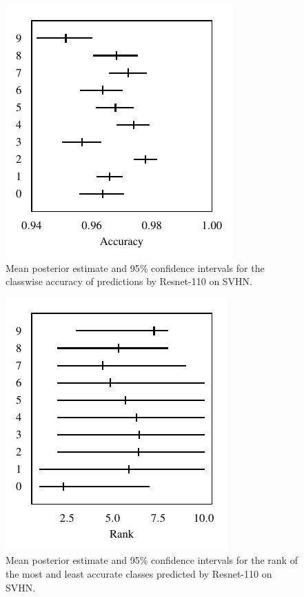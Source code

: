 \documentclass{article}
\begin{document}
\begin{figure}[t]
    \centering
    \includegraphics{figures/svhn_accuracy.pdf}
    \caption{
        Mean posterior estimate and 95\% confidence intervals for the classwise accuracy of predictions by Resnet-110 on SVHN.
    }
    \label{fig:svhn_acc}
\end{figure}

\begin{figure}[t]
    \centering
    \includegraphics{figures/svhn_rank.pdf}
    \caption{
        Mean posterior estimate and 95\% confidence intervals for the rank of the most and least accurate classes predicted by Resnet-110 on SVHN.
    }
    \label{fig:svhn_rank}
\end{figure}
\end{document}
